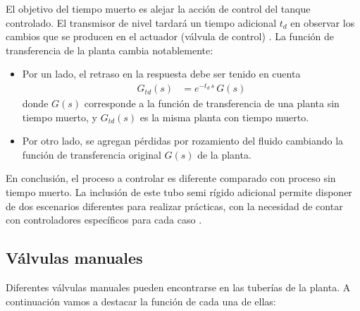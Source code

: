 El objetivo del tiempo muerto es alejar la acción de control del tanque
controlado.
El transmisor de nivel tardará un tiempo adicional $t_d$ en observar los cambios
que se producen en el actuador (válvula de control)
\cite{bib:ApuntesPuglesiTema2}.
La función de transferencia de la planta cambia notablemente:
\begin{itemize}
 \item Por un lado, el retraso en la respuesta debe ser tenido en cuenta
 \begin{align}
  G_{td}(s) &= e^{-t_d\,s}\,G(s)
 \end{align}
 donde $G(s)$ corresponde a la función de transferencia de una planta sin
 tiempo muerto, y $G_{td}(s)$ es la misma planta con tiempo muerto.
  \item Por otro lado, se agregan pérdidas por rozamiento del
  fluido cambiando la función de transferencia original $G(s)$ de la
  planta.
\end{itemize}
En conclusión, el proceso a controlar es diferente comparado con proceso sin
tiempo muerto.
La inclusión de este tubo semi rígido adicional permite disponer de dos
escenarios
diferentes para realizar prácticas, con la necesidad de contar con
controladores específicos para cada caso \cite{bib:ApuntesPuglesiTema2}.

\subsection{Válvulas manuales}

Diferentes válvulas manuales pueden encontrarse en las tuberías de la planta.
A continuación vamos a destacar la función de cada una de ellas:

